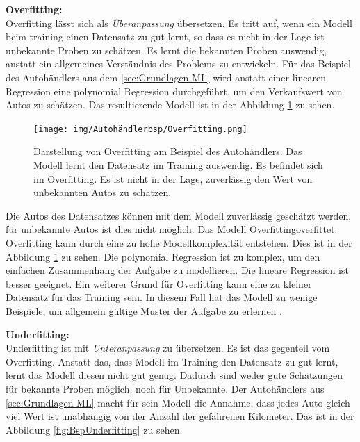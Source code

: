 \textbf{\gls{Overfitting}:}\\
\gls{Overfitting} lässt sich als \textit{Überanpassung} übersetzen. Es tritt auf, wenn ein Modell beim training einen Datensatz zu gut lernt, so dass es nicht in der Lage ist unbekannte Proben zu schätzen. Es lernt die bekannten Proben auswendig, anstatt ein allgemeines Verständnis des Problems zu entwickeln. Für das Beispiel des Autohändlers aus dem \autoref{sec:Grundlagen ML} wird anstatt einer linearen Regression eine polynomial Regression durchgeführt, um den Verkaufswert von Autos zu schätzen. Das resultierende Modell ist in der Abbildung \ref{fig:BspOverfitting} zu sehen.

\begin{figure}[htb]
    \centering
    \texttt{[image: img/Autohändlerbsp/Overfitting.png]}
    \caption[Darstellung von Overfitting am Beispiel des Autohändlers.]{Darstellung von Overfitting am Beispiel des Autohändlers. Das Modell lernt den Datensatz im Training auswendig. Es befindet sich im Overfitting. Es ist nicht in der Lage, zuverlässig den Wert von unbekannten Autos zu schätzen.}
    \label{fig:BspOverfitting}
\end{figure}

Die Autos des Datensatzes können mit dem Modell zuverlässig geschätzt werden, für unbekannte Autos ist dies nicht möglich. Das Modell \gls{Overfitting}{overfittet}. \gls{Overfitting} kann durch eine zu hohe Modellkomplexität entstehen. Dies ist in der Abbildung \ref{fig:BspOverfitting} zu sehen. Die polynomial Regression ist zu komplex, um den einfachen Zusammenhang der Aufgabe zu modellieren. Die lineare Regression ist besser geeignet. Ein weiterer Grund für \gls{Overfitting} kann eine zu kleiner Datensatz für das Training sein. In diesem Fall hat das Modell zu wenige Beispiele, um allgemein gültige Muster der Aufgabe zu erlernen \cite{Burkov.2019, Bishop.2006, Goodfellow.2016}.\dubpar

\textbf{\gls{Underfitting}:}\\
\gls{Underfitting} ist mit \textit{Unteranpassung} zu übersetzen. Es ist das gegenteil vom \gls{Overfitting}. Anstatt das, dass Modell im Training den Datensatz zu gut lernt, lernt das Modell diesen nicht gut genug. Dadurch sind weder gute Schätzungen für bekannte Proben möglich, noch für Unbekannte. Der Autohändlers aus \autoref{sec:Grundlagen ML} macht für sein Modell die Annahme, dass jedes Auto gleich viel Wert ist unabhängig von der Anzahl der gefahrenen Kilometer. Das ist in der Abbildung \ref{fig:BspUnderfitting} zu sehen.

